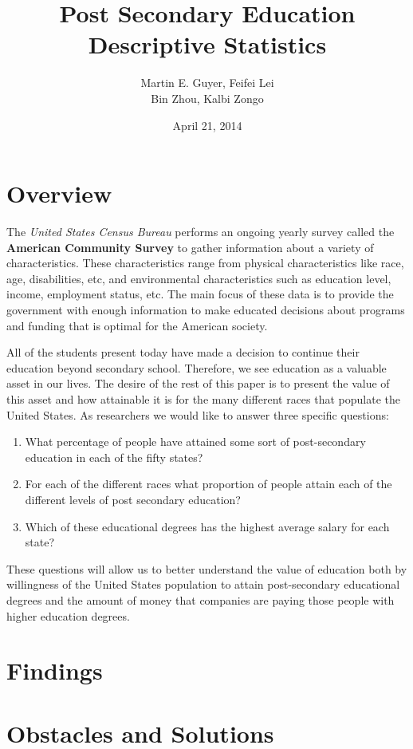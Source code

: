 \documentclass{article}
\title{Post Secondary Education Descriptive Statistics}
\author{Martin E. Guyer,  Feifei  Lei \\ Bin Zhou, Kalbi Zongo}
\date{April 21, 2014}
\begin{document}
\maketitle

\section{Overview}

The \emph{United States Census Bureau} performs an ongoing yearly survey called the \textbf{American Community
Survey} to gather information about a variety of characteristics. These characteristics range from physical characteristics
like race, age, disabilities, etc, and environmental characteristics such as education level, income, employment status, etc. 
The main focus of these data is to provide the government with enough information to make educated decisions about 
programs and funding that is optimal for the American society. 

All of the students present today have made a decision to continue their education beyond secondary school. Therefore,
we see education as a valuable asset in our lives. The desire of the rest of this paper is to present the value of this asset and
how attainable it is for the many different races that populate the United States. As researchers we would like to answer 
three specific questions:
	\begin{enumerate}
	\item What percentage of people have attained some sort of post-secondary education in each of the fifty states?
	
	\item For each of the different races what proportion of people
  attain each of the different levels of post secondary education? 
	
	\item Which of these educational degrees has the highest average salary for each state?
	\end{enumerate}
These questions will allow us to better understand the value of education both by willingness of the United States
population to attain post-secondary educational degrees and the amount of money that companies are paying
those people with higher education degrees. 

\section{Findings}

\section{Obstacles and Solutions}
\end{document}
